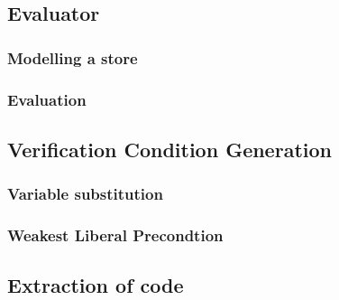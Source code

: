 \subsection{Evaluator}


\subsubsection{Modelling a store}


\subsubsection{Evaluation}


\subsection{Verification Condition Generation}


\subsubsection{Variable substitution}


\subsubsection{Weakest Liberal Precondtion}


\subsection{Extraction of code}
